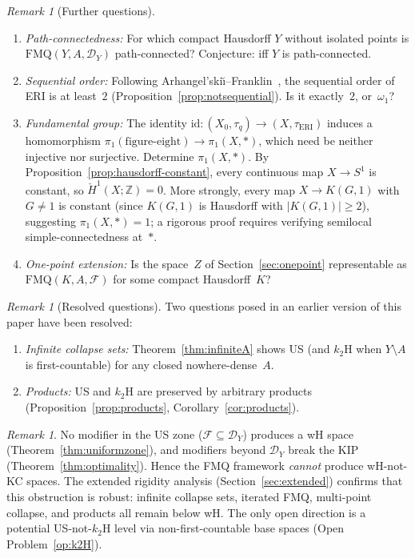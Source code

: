 \documentclass[11pt]{article}
\theoremstyle{definition}
\theoremstyle{remark}
\newtheorem{remark}[theorem]{Remark}
\begin{document}
\begin{remark}[Further questions]\label{rem:further}
\begin{enumerate}[label=\textup{(\alph*)},nosep]
\item\label{op:pathconnected} \emph{Path-connectedness:} For which compact Hausdorff $Y$
  without isolated points is $\mathrm{FMQ}(Y, A, \mathcal{D}_Y)$
  path-connected? Conjecture: iff $Y$ is path-connected.
\item\label{op:seqorder} \emph{Sequential order:} Following
  Arhangel'ski\u{\i}--Franklin~\cite{bib:arhangelskii-franklin}, the
  sequential order of ERI is at least~$2$
  (Proposition~\ref{prop:notsequential}). Is it exactly~$2$,
  or~$\omega_1$?
\item\label{op:pi1} \emph{Fundamental group:} The identity
  $\mathrm{id}\colon (X_0, \tau_q) \to (X, \tau_{\mathrm{ERI}})$
  induces a homomorphism
  $\pi_1(\text{figure-eight}) \to \pi_1(X, \ast)$, which need be
  neither injective nor surjective.
  Determine $\pi_1(X, \ast)$.
  By Proposition~\ref{prop:hausdorff-constant}, every continuous
  map $X \to S^1$ is constant, so $\check{H}^1(X; \mathbb{Z}) = 0$.
  More strongly, every map $X \to K(G,1)$ with $G \neq 1$ is
  constant (since $K(G,1)$ is Hausdorff with $|K(G,1)| \geq 2$),
  suggesting $\pi_1(X, \ast) = 1$; a rigorous proof requires
  verifying semilocal simple-connectedness at~$\ast$.
\item\label{op:onepoint} \emph{One-point extension:} Is the space~$Z$ of
  Section~\ref{sec:onepoint} representable as
  $\mathrm{FMQ}(K, A, \mathcal{F})$ for some compact Hausdorff~$K$?
\end{enumerate}
\end{remark}

\begin{remark}[Resolved questions]\label{rem:resolved}
Two questions posed in an earlier version of this paper
have been resolved:
\begin{enumerate}[nosep]
\item\label{op:infiniteA} \emph{Infinite collapse sets:}
Theorem~\ref{thm:infiniteA} shows US (and $k_2$H when
$Y \setminus A$ is first-countable) for any closed
nowhere-dense~$A$.
\item\label{op:products} \emph{Products:}
US and $k_2$H are preserved by arbitrary products
(Proposition~\ref{prop:products}, Corollary~\ref{cor:products}).
\end{enumerate}
\end{remark}

\begin{remark}\label{rem:nowHnotKC}
No modifier in the US zone ($\mathcal{F} \subseteq \mathcal{D}_Y$) produces
a wH space (Theorem~\ref{thm:uniformzone}), and modifiers beyond $\mathcal{D}_Y$ break the
KIP (Theorem~\ref{thm:optimality}). Hence the FMQ framework \emph{cannot} produce
wH-not-KC spaces.
The extended rigidity analysis
(Section~\ref{sec:extended}) confirms that this obstruction is
robust: infinite collapse sets, iterated FMQ, multi-point collapse,
and products all remain below wH.
The only open direction is a potential US-not-$k_2$H level via
non-first-countable base spaces (Open Problem~\ref{op:k2H}).
\end{remark}
\end{document}
